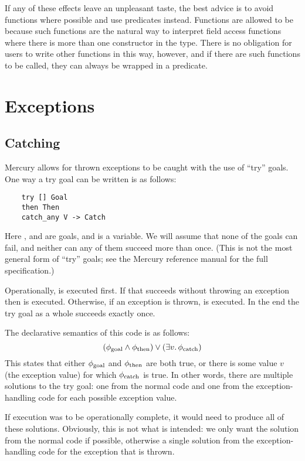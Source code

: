 If any of these effects leave an unpleasant taste,
the best advice is to avoid  functions where possible
and use  predicates instead.
Functions are allowed to be 
because such functions are the natural way
to interpret field access functions
where there is more than one constructor in the type.
There is no obligation for users to write other functions in this way,
however,
and if there are such functions to be called,
they can always be wrapped in a  predicate.


\section{Exceptions}
\label{sec:exceptions}

\subsection{Catching}
\label{sec:catch}

Mercury allows for thrown exceptions to be caught
with the use of ``try'' goals.
One way a try goal can be written is as follows:
\begin{verbatim}
    try [] Goal
    then Then
    catch_any V -> Catch
\end{verbatim}
Here ,  and  are goals,
and  is a variable.
We will assume that none of the goals can fail,
and neither can any of them succeed more than once.
(This is not the most general form of ``try'' goals;
see the Mercury reference manual for the full specification.)

Operationally,
 is executed first.
If that succeeds without throwing an exception
then  is executed.
Otherwise, if an exception is thrown,
 is executed.
In the end the try goal as a whole succeeds exactly once.

The declarative semantics of this code is as follows:
\[
    (\phi_{\operatorname{goal}} \land \phi_{\operatorname{then}}) \lor
    (\exists v.\, \phi_{\operatorname{catch}})
\]
This states that either
$\phi_{\operatorname{goal}}$ and $\phi_{\operatorname{then}}$ are both true,
or there is some value $v$ (the exception value)
for which $\phi_{\operatorname{catch}}$ is true.
In other words,
there are multiple solutions to the try goal:
one from the normal code
and one from the exception-handling code
for each possible exception value.

If execution was to be operationally complete,
it would need to produce all of these solutions.
Obviously,
this is not what is intended:
we only want the solution from the normal code if possible,
otherwise a single solution from the exception-handling code
for the exception that is thrown.

